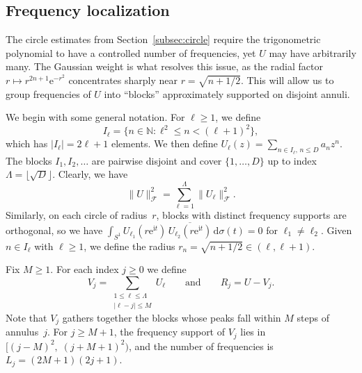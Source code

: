 \documentclass[11pt]{amsart}
\theoremstyle{remark}
\begin{document}
\subsection{Frequency localization}\label{subsec:blocks}
The circle estimates from Section~\ref{subsec:circle} require the trigonometric
polynomial to have a controlled number of frequencies, yet $U$ may have
arbitrarily many.  The Gaussian weight is what resolves this issue, as the radial factor
$r \mapsto r^{2n+1}\mathrm{e}^{-r^2}$ concentrates sharply near $r = \sqrt{n + 1/2}$. This will allow us to group frequencies of $U$ into ``blocks''
approximately supported on disjoint annuli.
\medskip

We begin with some general notation. For $\ell \ge 1$, we define 
\[
I_\ell = \bigl\{n \in \mathbb{N} : \ell^2 \le n < (\ell+1)^2\bigr\},
\]
which has $\lvert I_\ell \rvert = 2\ell+1$ elements. We then define 
$U_\ell(z) = \sum_{n \in I_\ell,\, n \le D} a_n z^n$. The blocks $I_1, I_2, \dots$ are pairwise disjoint and cover
$\{1, \dots, D\}$ up to index $\Lambda = \lfloor\sqrt{D}\rfloor$.  Clearly, we have
\begin{equation}\label{eq:fock-decomp}
\lVert U \rVert_{\mathcal{F}}^2 = \sum_{\ell=1}^{\Lambda} \lVert U_\ell \rVert_{\mathcal{F}}^2.
\end{equation}
Similarly, on each circle of radius~$r$, blocks with distinct frequency
supports are orthogonal, so we have
$\int_{S^1} U_{\ell_1}(r\mathrm{e}^{\mathrm{i} t})\,
\overline{U_{\ell_2}(r\mathrm{e}^{\mathrm{i} t})}\,\mathrm{d}\sigma(t) = 0$
for $\ell_1 \ne \ell_2$. Given $n\in I_\ell$ with $\ell \geq 1$, we define the radius $r_n = \sqrt{n+1/2}\in (\ell, \ell+1)$. \medskip

Fix  $M \ge 1$.  For each index $j \ge 0$ we define 
\[
V_j = \sum_{\substack{1 \le \ell \le \Lambda \\ \lvert \ell - j \rvert \le M}} U_\ell
\qquad\text{and} \qquad
R_j = U - V_j.
\]
Note that $V_j$ gathers together the blocks whose peaks fall within $M$ steps of
annulus~$j$. For $j \ge M + 1$, the frequency support of $V_j$ lies in
$[(j{-}M)^2,\; (j{+}M{+}1)^2)$, and the number of frequencies is
$L_j = (2M{+}1)(2j{+}1)$.
\medskip
\end{document}
